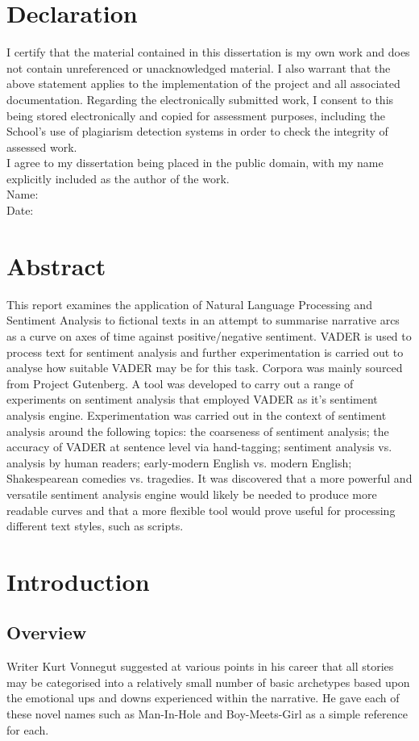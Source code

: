 \documentclass{article}
\begin{document}
\section*{Declaration}
    I certify that the material contained in this dissertation is my own work and does not contain unreferenced or unacknowledged material. I also warrant that the above statement applies to the implementation of the project and all associated documentation. Regarding the electronically submitted work, I consent to this being stored electronically and copied for assessment purposes, including the School’s use of plagiarism detection systems in order to check the integrity of assessed work. \\
    I agree to my dissertation being placed in the public domain, with my name explicitly included as the author of the work. \\
    
    \noindent
    Name: \\
    Date:
\newpage
\section*{Abstract}
    This report examines the application of Natural Language Processing and Sentiment Analysis to fictional texts in an attempt to summarise narrative arcs as a curve on axes of time against positive/negative sentiment. VADER is used to process text for sentiment analysis and further experimentation is carried out to analyse how suitable VADER may be for this task. Corpora was mainly sourced from Project Gutenberg. A tool was developed to carry out a range of experiments on sentiment analysis that employed VADER as it's sentiment analysis engine. Experimentation was carried out in the context of sentiment analysis around the following topics: the coarseness of sentiment analysis; the accuracy of VADER at sentence level via hand-tagging; sentiment analysis vs. analysis by human readers; early-modern English vs. modern English; Shakespearean comedies vs. tragedies. It was discovered that a more powerful and versatile sentiment analysis engine would likely be needed to produce more readable curves and that a more flexible tool would prove useful for processing different text styles, such as scripts.
\newpage
\tableofcontents
\newpage
\section{Introduction}
    \subsection{Overview}
        Writer Kurt Vonnegut suggested at various points in his career that all stories may be categorised into a relatively small number of basic archetypes based upon the emotional ups and downs experienced within the narrative. He gave each of these novel names such as Man-In-Hole and Boy-Meets-Girl as a simple reference for each. \cite{vonnegutLecture}
\end{document}
